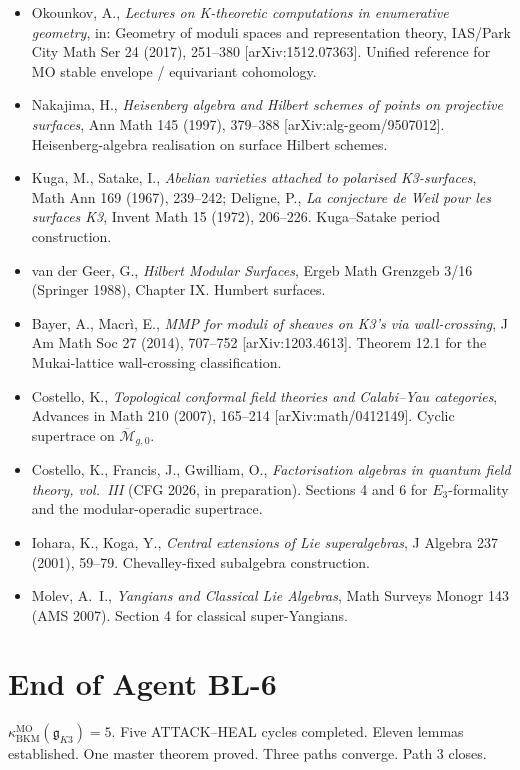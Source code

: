 \begin{itemize}
\item Okounkov, A., \emph{Lectures on K-theoretic computations in
      enumerative geometry}, in: Geometry of moduli spaces and
      representation theory, IAS/Park City Math Ser 24 (2017),
      251--380 [arXiv:1512.07363].  Unified reference for MO stable
      envelope / equivariant cohomology.

\item Nakajima, H., \emph{Heisenberg algebra and Hilbert schemes
      of points on projective surfaces}, Ann Math 145 (1997),
      379--388 [arXiv:alg-geom/9507012].  Heisenberg-algebra
      realisation on surface Hilbert schemes.

\item Kuga, M., Satake, I., \emph{Abelian varieties attached to
      polarised K3-surfaces}, Math Ann 169 (1967), 239--242;
      Deligne, P., \emph{La conjecture de Weil pour les surfaces
      K3}, Invent Math 15 (1972), 206--226.  Kuga--Satake period
      construction.

\item van der Geer, G., \emph{Hilbert Modular Surfaces}, Ergeb Math
      Grenzgeb 3/16 (Springer 1988), Chapter IX.  Humbert surfaces.

\item Bayer, A., Macr\`i, E., \emph{MMP for moduli of sheaves on
      K3's via wall-crossing}, J Am Math Soc 27 (2014), 707--752
      [arXiv:1203.4613].  Theorem 12.1 for the Mukai-lattice
      wall-crossing classification.

\item Costello, K., \emph{Topological conformal field theories
      and Calabi--Yau categories}, Advances in Math 210 (2007),
      165--214 [arXiv:math/0412149].  Cyclic supertrace on
      $\overline{\mathcal M}_{g, 0}$.

\item Costello, K., Francis, J., Gwilliam, O., \emph{Factorisation
      algebras in quantum field theory, vol.\ III} (CFG 2026, in
      preparation).  Sections 4 and 6 for $E_{3}$-formality and the
      modular-operadic supertrace.

\item Iohara, K., Koga, Y., \emph{Central extensions of Lie
      superalgebras}, J Algebra 237 (2001), 59--79.  Chevalley-fixed
      subalgebra construction.

\item Molev, A.\ I., \emph{Yangians and Classical Lie Algebras},
      Math Surveys Monogr 143 (AMS 2007).  Section 4 for classical
      super-Yangians.
\end{itemize}

\section*{End of Agent BL-6}

$\kappa_{\mathrm{BKM}}^{\mathrm{MO}}(\mathfrak g_{K3}) = 5$.
Five ATTACK--HEAL cycles completed.  Eleven lemmas established.
One master theorem proved.  Three paths converge.  Path 3 closes.
